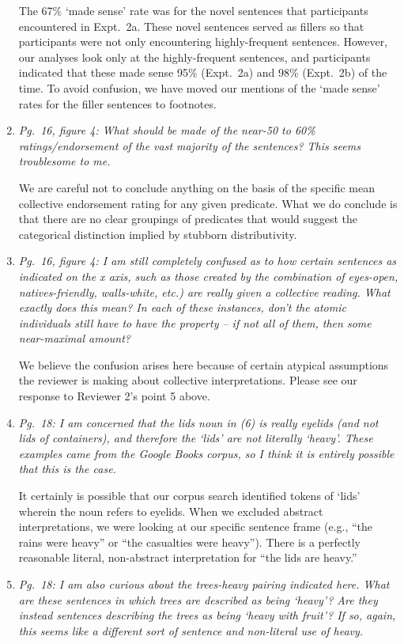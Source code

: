 \documentclass[12pt]{article}
\begin{document}
\begin{enumerate}
The 67\% `made sense' rate was for the novel sentences that participants encountered in Expt.~2a. These novel sentences served as fillers so that participants were not only encountering highly-frequent sentences. However, our analyses look only at the highly-frequent sentences, and participants indicated that these made sense 95\% (Expt.~2a) and 98\% (Expt.~2b) of the time. To avoid confusion, we have moved our mentions of the `made sense' rates for the filler sentences to footnotes.

\item \emph{Pg.~16, figure 4: What should be made of the near-50 to 60\% ratings/endorsement of the vast majority of the sentences? This seems troublesome to me.}

We are careful not to conclude anything on the basis of the specific mean collective endorsement rating for any given predicate. What we do conclude is that there are no clear groupings of predicates that would suggest the categorical distinction implied by stubborn distributivity.

\item \emph{Pg.~16, figure 4: I am still completely confused as to how certain sentences as indicated on the x axis, such as those created by the combination of eyes-open, natives-friendly, walls-white, etc.) are really given a collective reading. What exactly does this mean? In each of these instances, don’t the atomic individuals still have to have the property – if not all of them, then some near-maximal amount?}

We believe the confusion arises here because of certain atypical assumptions the reviewer is making about collective interpretations. Please see our response to Reviewer 2's point 5 above.

\item \emph{Pg.~18: I am concerned that the \emph{lids} noun in (6) is really eyelids (and not lids of containers), and therefore the `lids' are not literally ‘heavy’. These examples came from the Google Books corpus, so I think it is entirely possible that this is the case.}

It certainly is possible that our corpus search identified tokens of `lids' wherein the noun refers to eyelids. When we excluded abstract interpretations, we were looking at our specific sentence frame (e.g., ``the rains were heavy'' or ``the casualties were heavy''). There is a perfectly reasonable literal, non-abstract interpretation for ``the lids are heavy.'' 

\item \emph{Pg.~18: I am also curious about the \emph{trees-heavy} pairing indicated here. What are these sentences in which trees are described as being `heavy'? Are they instead sentences describing the trees as being `heavy with fruit'? If so, again, this seems like a different sort of sentence and non-literal use of heavy.}


\end{enumerate}
\end{document}
